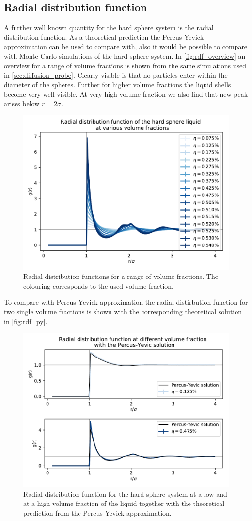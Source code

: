 \subsection{Radial distribution function}
\label{sec:RDF_prob}
A further well known quantity for the hard sphere system is the radial distribution function. As a theoretical prediction the Percus-Yevick approximation can be used to compare with, also it would be possible to compare with Monte Carlo simulations of the hard sphere system. In \autoref{fig:rdf_overview} an overview for a range of volume fractions is shown from the same simulations used in \autoref{sec:diffusion_probe}. Clearly visible is that no particles enter within the diameter of the spheres. Further for higher volume fractions the liquid shells become very well visible. At very high volume fraction we also find that  new peak arises below $r = 2 \sigma$.
\begin{figure}[h]
\centering
\includegraphics[width=0.7 \linewidth]{../plots/RDF.pdf}
\caption{Radial distribution functions for a range of volume fractions. The colouring corresponds to the used volume fraction.}
\label{fig:rdf_overview}
\end{figure}

To compare with Percus-Yevick approximation the radial distirbution function for two single volume fractions is shown with the corresponding theoretical solution in \autoref{fig:rdf_py}.
\begin{figure}[h]
\centering
\includegraphics[width=0.7 \linewidth]{../plots/RDF_percus_yevick.pdf}
\caption{Radial distribution function for the hard sphere system at a low and at a high volume fraction of the liquid together with the theoretical prediction from the Percus-Yevick approximation.}
\label{fig:rdf_py}
\end{figure}

